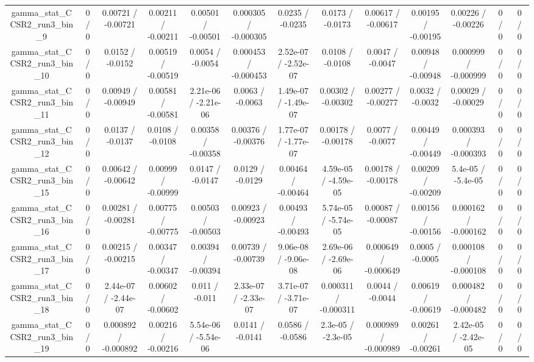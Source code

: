 \documentclass[10pt]{article}
\begin{document}
\begin{table}[htbp]
\begin{center}
\begin{tabular}{|c|c|c|c|c|c|c|c|c|c|c|c|c|}
  gamma_stat_CCSR2_run3_bin_9 & 0 / 0 & 0.00721 / -0.00721 & 0.00211 / -0.00211 & 0.00501 / -0.00501 & 0.000305 / -0.000305 & 0.0235 / -0.0235 & 0.0173 / -0.0173 & 0.00617 / -0.00617 & 0.00195 / -0.00195 & 0.00226 / -0.00226 & 0 / 0 & 0 / 0 \\ 
  gamma_stat_CCSR2_run3_bin_10 & 0 / 0 & 0.0152 / -0.0152 & 0.00519 / -0.00519 & 0.0054 / -0.0054 & 0.000453 / -0.000453 & 2.52e-07 / -2.52e-07 & 0.0108 / -0.0108 & 0.0047 / -0.0047 & 0.00948 / -0.00948 & 0.000999 / -0.000999 & 0 / 0 & 0 / 0 \\ 
  gamma_stat_CCSR2_run3_bin_11 & 0 / 0 & 0.00949 / -0.00949 & 0.00581 / -0.00581 & 2.21e-06 / -2.21e-06 & 0.0063 / -0.0063 & 1.49e-07 / -1.49e-07 & 0.00302 / -0.00302 & 0.00277 / -0.00277 & 0.0032 / -0.0032 & 0.00029 / -0.00029 & 0 / 0 & 0 / 0 \\ 
  gamma_stat_CCSR2_run3_bin_12 & 0 / 0 & 0.0137 / -0.0137 & 0.0108 / -0.0108 & 0.00358 / -0.00358 & 0.00376 / -0.00376 & 1.77e-07 / -1.77e-07 & 0.00178 / -0.00178 & 0.0077 / -0.0077 & 0.00449 / -0.00449 & 0.000393 / -0.000393 & 0 / 0 & 0 / 0 \\ 
  gamma_stat_CCSR2_run3_bin_15 & 0 / 0 & 0.00642 / -0.00642 & 0.00999 / -0.00999 & 0.0147 / -0.0147 & 0.0129 / -0.0129 & 0.00464 / -0.00464 & 4.59e-05 / -4.59e-05 & 0.00178 / -0.00178 & 0.00209 / -0.00209 & 5.4e-05 / -5.4e-05 & 0 / 0 & 0 / 0 \\ 
  gamma_stat_CCSR2_run3_bin_16 & 0 / 0 & 0.00281 / -0.00281 & 0.00775 / -0.00775 & 0.00503 / -0.00503 & 0.00923 / -0.00923 & 0.00493 / -0.00493 & 5.74e-05 / -5.74e-05 & 0.00087 / -0.00087 & 0.00156 / -0.00156 & 0.000162 / -0.000162 & 0 / 0 & 0 / 0 \\ 
  gamma_stat_CCSR2_run3_bin_17 & 0 / 0 & 0.00215 / -0.00215 & 0.00347 / -0.00347 & 0.00394 / -0.00394 & 0.00739 / -0.00739 & 9.06e-08 / -9.06e-08 & 2.69e-06 / -2.69e-06 & 0.000649 / -0.000649 & 0.0005 / -0.0005 & 0.000108 / -0.000108 & 0 / 0 & 0 / 0 \\ 
  gamma_stat_CCSR2_run3_bin_18 & 0 / 0 & 2.44e-07 / -2.44e-07 & 0.00602 / -0.00602 & 0.011 / -0.011 & 2.33e-07 / -2.33e-07 & 3.71e-07 / -3.71e-07 & 0.000311 / -0.000311 & 0.0044 / -0.0044 & 0.00619 / -0.00619 & 0.000482 / -0.000482 & 0 / 0 & 0 / 0 \\ 
  gamma_stat_CCSR2_run3_bin_19 & 0 / 0 & 0.000892 / -0.000892 & 0.00216 / -0.00216 & 5.54e-06 / -5.54e-06 & 0.0141 / -0.0141 & 0.0586 / -0.0586 & 2.3e-05 / -2.3e-05 & 0.000989 / -0.000989 & 0.00261 / -0.00261 & 2.42e-05 / -2.42e-05 & 0 / 0 & 0 / 0 \\ 

\end{tabular}
\end{center}
\end{table}
\end{document}
